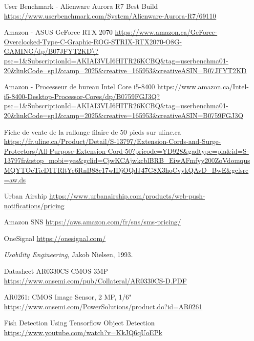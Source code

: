 \begin{thebibliographyUL}{9}
 User Benchmark - Alienware Aurora R7 Best Build
\url{https://www.userbenchmark.com/System/Alienware-Aurora-R7/69110}

 Amazon - ASUS GeForce RTX 2070 \url{https://www.amazon.ca/GeForce-Overclocked-Type-C-Graphic-ROG-STRIX-RTX2070-O8G-GAMING/dp/B07JFYT2KD\?psc=1\&SubscriptionId=AKIAI3VLI6HITR26KCBQ\&tag=userbenchma01-20\&linkCode=sp1\&camp=2025\&creative=165953\&creativeASIN=B07JFYT2KD}

 Amazon - Processeur de bureau Intel Core i5-8400 \url{https://www.amazon.ca/Intel-i5-8400-Desktop-Processor-Cores/dp/B0759FGJ3Q?psc=1\&SubscriptionId=AKIAI3VLI6HITR26KCBQ\&tag=userbenchma01-20\&linkCode=sp1\&camp=2025\&creative=165953\&creativeASIN=B0759FGJ3Q}

 Fiche de vente de la rallonge filaire de 50 pieds sur uline.ca 
\url{https://fr.uline.ca/Product/Detail/S-13797/Extension-Cords-and-Surge-Protectors/All-Purpose-Extension-Cord-50?pricode=YD928&gadtype=pla&id=S-13797fr&stop_mobi=yes&gclid=CjwKCAjwkcblBRB_EiwAFmfyy200ZoVdomqusMQYTOcTieD1TRltYc6RnB88c17wIDjOQdJ47G8X3hoCvykQAvD_BwE&gclsrc=aw.ds}

 Urban Airship \url{https://www.urbanairship.com/products/web-push-notifications/pricing}

 Amazon SNS \url{https://aws.amazon.com/fr/sns/sms-pricing/}

 OneSignal \url{https://onesignal.com/}

 \emph{Usability Engineering}, Jakob Nielsen, 1993.

 Datasheet AR0330CS CMOS 3MP  \url{https://www.onsemi.com/pub/Collateral/AR0330CS-D.PDF}

 AR0261: CMOS Image Sensor, 2 MP, 1/6" \url{https://www.onsemi.com/PowerSolutions/product.do?id=AR0261}

 Fish Detection Using Tensorflow Object Detection
 \url{https://www.youtube.com/watch?v=KkJQ6qUoEPk}

\end{thebibliographyUL}